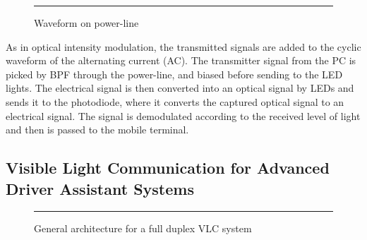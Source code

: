 \begin{figure}[htbp]
  \centering
    \rule{35em}{0.5pt}
  \caption[Waveform on power-linel]{Waveform on power-line}
  \label{fig:vlc-powerline}
\end{figure}

As in optical intensity modulation, the transmitted signals are added to the cyclic
waveform of the alternating current (AC). The transmitter signal from the PC is picked
by BPF through the power-line, and biased before sending to the LED lights. The
electrical signal is then converted into an optical signal by LEDs and sends it to the
photodiode, where it converts the captured optical signal to an electrical signal. The
signal is demodulated according to the received level of light and then is passed to the
mobile terminal.

\subsection{Visible Light Communication for Advanced Driver Assistant Systems}

\begin{figure}[htbp]
  \centering
    \rule{35em}{0.5pt}
  \caption[General architecture for a full duplex VLC system ]{General architecture for a full duplex VLC system }
  \label{fig:vlc-driver}
\end{figure}

